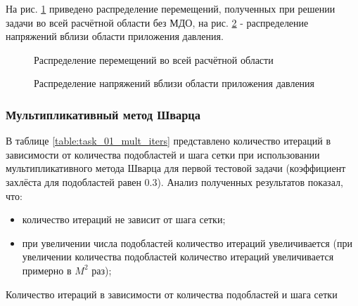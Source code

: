 \documentclass[a4paper]{article}
\begin{document}
\newpage

На рис. \ref{fig:task_01_basic_displacement_distribution} приведено распределение перемещений, полученных при решении задачи во всей расчётной области без МДО, на рис. \ref{fig:task_01_basic_pressure_distribution} - распределение напряжений вблизи области приложения давления.

\begin{figure}[h]
\caption{Распределение перемещений во всей расчётной области}
\label{fig:task_01_basic_displacement_distribution}
\end{figure}

\begin{figure}[h]
\caption{Распределение напряжений вблизи области приложения давления}
\label{fig:task_01_basic_pressure_distribution}
\end{figure}

\newpage

\subsubsection{Мультипликативный метод Шварца}

В таблице \ref{table:task_01_mult_iters} представлено количество итераций в зависимости от количества подобластей и шага сетки при использовании мультипликативного метода Шварца для первой тестовой задачи (коэффициент захлёста для подобластей равен 0.3). Анализ полученных результатов показал, что:
\begin{itemize}
\item количество итераций не зависит от шага сетки;
\item при увеличении числа подобластей количество итераций увеличивается (при увеличении количества подобластей количество итераций увеличивается примерно в $M^2$ раз);
\end{itemize}

\begin{table}[h]
\caption{Количество итераций в зависимости от количества подобластей и шага сетки}
\label{table:task_01_mult_iters}
\end{table}
\end{document}
